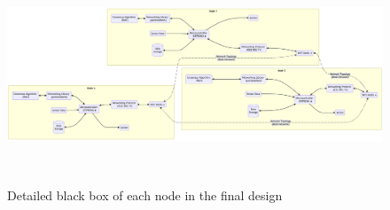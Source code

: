 \begin{figure}[H]
    \centering
    \includegraphics[width=1\textwidth]{images/final_design_nodes.png}
    \caption{Detailed black box of each node in the final design}
    \label{fig:final_design_node_bb}
    


     

      
\end{figure}


